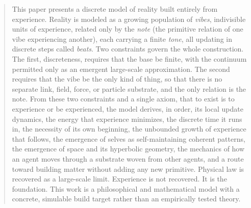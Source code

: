 \begin{abstract}
This paper presents a discrete model of reality built entirely from experience. Reality is modeled as a growing population of \emph{vibes}, indivisible units of experience, related only by the \emph{note} (the primitive relation of one vibe experiencing another), each carrying a finite \emph{tone}, all updating in discrete steps called \emph{beats}. Two constraints govern the whole construction. The first, discreteness, requires that the base be finite, with the continuum permitted only as an emergent large-scale approximation. The second requires that the vibe be the only kind of thing, so that there is no separate link, field, force, or particle substrate, and the only relation is the note. From these two constraints and a single axiom, that to exist is to experience or be experienced, the model derives, in order, its local update dynamics, the energy that experience minimizes, the discrete time it runs in, the necessity of its own beginning, the unbounded growth of experience that follows, the emergence of selves as self-maintaining coherent patterns, the emergence of space and its hyperbolic geometry, the mechanics of how an agent moves through a substrate woven from other agents, and a route toward building matter without adding any new primitive. Physical law is recovered as a large-scale limit. Experience is not recovered. It is the foundation. This work is a philosophical and mathematical model with a concrete, simulable build target rather than an empirically tested theory.
\end{abstract}
